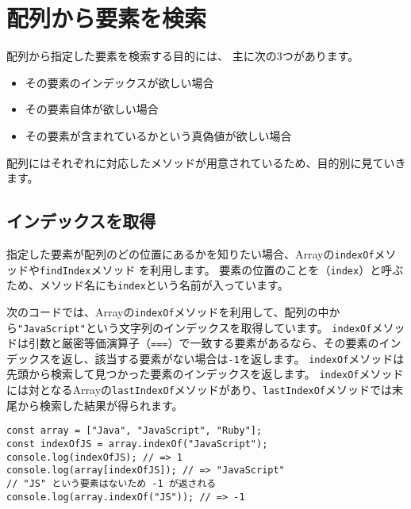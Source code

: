 \hypertarget{search-element}{%
\section{配列から要素を検索}\label{search-element}}

配列から指定した要素を検索する目的には、 主に次の3つがあります。

\begin{itemize}
\item
  その要素のインデックスが欲しい場合
\item
  その要素自体が欲しい場合
\item
  その要素が含まれているかという真偽値が欲しい場合
\end{itemize}

配列にはそれぞれに対応したメソッドが用意されているため、目的別に見ていきます。

\hypertarget{indexof}{%
\subsection{インデックスを取得}\label{indexof}}

指定した要素が配列のどの位置にあるかを知りたい場合、Arrayの\texttt{indexOf}メソッドや\texttt{findIndex}メソッド\,\protect{}\,を利用します。
要素の位置のことを\textbf{}（\texttt{index}）と呼ぶため、メソッド名にも\texttt{index}という名前が入っています。

次のコードでは、Arrayの\texttt{indexOf}メソッドを利用して、配列の中から\texttt{"JavaScript"}という文字列のインデックスを取得しています。
\texttt{indexOf}メソッドは引数と厳密等価演算子（\texttt{===}）で一致する要素があるなら、その要素のインデックスを返し、該当する要素がない場合は\texttt{-1}を返します。
\texttt{indexOf}メソッドは先頭から検索して見つかった要素のインデックスを返します。
\texttt{indexOf}メソッドには対となるArrayの\texttt{lastIndexOf}メソッドがあり、\texttt{lastIndexOf}メソッドでは末尾から検索した結果が得られます。

\begin{lstlisting}
const array = ["Java", "JavaScript", "Ruby"];
const indexOfJS = array.indexOf("JavaScript");
console.log(indexOfJS); // => 1
console.log(array[indexOfJS]); // => "JavaScript"
// "JS" という要素はないため -1 が返される
console.log(array.indexOf("JS")); // => -1
\end{lstlisting}


